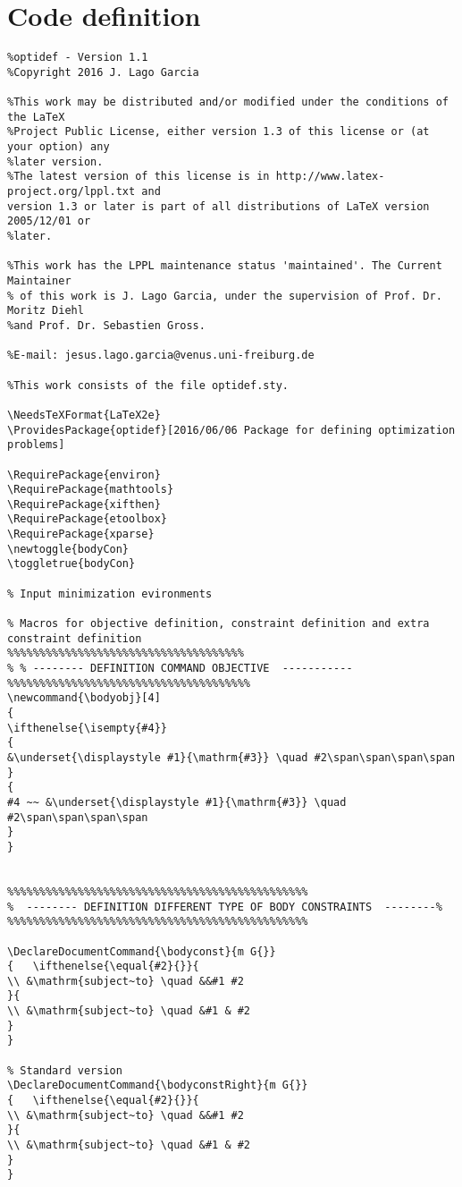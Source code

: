 \documentclass[]{report}
\begin{document}
\section{Code definition}
\begin{verbatim}
%optidef - Version 1.1
%Copyright 2016 J. Lago Garcia

%This work may be distributed and/or modified under the conditions of the LaTeX
%Project Public License, either version 1.3 of this license or (at your option) any 
%later version.
%The latest version of this license is in http://www.latex-project.org/lppl.txt and 
version 1.3 or later is part of all distributions of LaTeX version 2005/12/01 or 
%later.

%This work has the LPPL maintenance status 'maintained'. The Current Maintainer 
% of this work is J. Lago Garcia, under the supervision of Prof. Dr. Moritz Diehl 
%and Prof. Dr. Sebastien Gross.

%E-mail: jesus.lago.garcia@venus.uni-freiburg.de

%This work consists of the file optidef.sty.

\NeedsTeXFormat{LaTeX2e}
\ProvidesPackage{optidef}[2016/06/06 Package for defining optimization problems]

\RequirePackage{environ}
\RequirePackage{mathtools}	
\RequirePackage{xifthen}	
\RequirePackage{etoolbox}	
\RequirePackage{xparse}	
\newtoggle{bodyCon}
\toggletrue{bodyCon}

% Input minimization evironments

% Macros for objective definition, constraint definition and extra constraint definition
%%%%%%%%%%%%%%%%%%%%%%%%%%%%%%%%%%%%%
% % -------- DEFINITION COMMAND OBJECTIVE  -----------
%%%%%%%%%%%%%%%%%%%%%%%%%%%%%%%%%%%%%%
\newcommand{\bodyobj}[4]
{
\ifthenelse{\isempty{#4}}
{
&\underset{\displaystyle #1}{\mathrm{#3}} \quad #2\span\span\span\span
}
{
#4 ~~ &\underset{\displaystyle #1}{\mathrm{#3}} \quad #2\span\span\span\span
}
}


%%%%%%%%%%%%%%%%%%%%%%%%%%%%%%%%%%%%%%%%%%%%%%%
%  -------- DEFINITION DIFFERENT TYPE OF BODY CONSTRAINTS  --------%
%%%%%%%%%%%%%%%%%%%%%%%%%%%%%%%%%%%%%%%%%%%%%%%

\DeclareDocumentCommand{\bodyconst}{m G{}}
{	\ifthenelse{\equal{#2}{}}{
\\ &\mathrm{subject~to} \quad &&#1 #2
}{
\\ &\mathrm{subject~to} \quad &#1 & #2
}
}

% Standard version
\DeclareDocumentCommand{\bodyconstRight}{m G{}}
{	\ifthenelse{\equal{#2}{}}{
\\ &\mathrm{subject~to} \quad &&#1 #2
}{
\\ &\mathrm{subject~to} \quad &#1 & #2
}
}


\end{verbatim}
\end{document}
